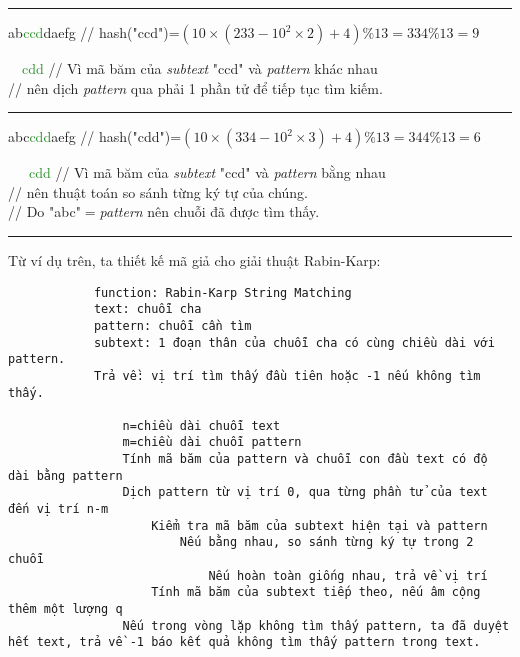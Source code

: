 \documentclass[a4paper,11pt]{article}
\begin{document}
			\vspace*{2mm}
			\hrule
			ab\textcolor{ForestGreen}{ccd}daefg \hspace*{0.6cm} // hash("ccd")=$(10\times(233-10^2\times2)+4)\%13=334\%13=9$
			
			\textcolor{white}{aa}\textcolor{ForestGreen}{cdd} \hspace*{1.4cm} // Vì mã băm của \textit{subtext} "ccd" và \textit{pattern} khác nhau \\
		\hspace*{2.5cm} // nên dịch \textit{pattern} qua phải 1 phần tử để tiếp tục tìm kiếm.

			\vspace*{2mm}
			\hrule
			abc\textcolor{ForestGreen}{cdd}aefg \hspace*{0.6cm} // hash("cdd")=$(10\times(334-10^2\times3)+4)\%13=344\%13=6$
			
			\textcolor{white}{aaa}\textcolor{ForestGreen}{cdd} \hspace*{1.2cm} // Vì mã băm của \textit{subtext} "ccd" và \textit{pattern} bằng nhau \\
		\hspace*{2.5cm} // nên thuật toán so sánh từng ký tự của chúng.\\
		\hspace*{2.5cm} // Do "abc"$=$\textit{pattern} nên chuỗi đã được tìm thấy.

		\vspace*{2mm}
		\hrule
		\vspace*{4mm}
		Từ ví dụ trên, ta thiết kế mã giả cho giải thuật Rabin-Karp:

			\begin{lstlisting}
			function: Rabin-Karp String Matching
			text: chuỗi cha 
			pattern: chuỗi cần tìm 
			subtext: 1 đoạn thân của chuỗi cha có cùng chiều dài với pattern.
			Trả về: vị trí tìm thấy đầu tiên hoặc -1 nếu không tìm thấy.
			
				n=chiều dài chuỗi text
				m=chiều dài chuỗi pattern
				Tính mã băm của pattern và chuỗi con đầu text có độ dài bằng pattern
				Dịch pattern từ vị trí 0, qua từng phần tử của text đến vị trí n-m
					Kiểm tra mã băm của subtext hiện tại và pattern
						Nếu bằng nhau, so sánh từng ký tự trong 2 chuỗi
							Nếu hoàn toàn giống nhau, trả về vị trí
					Tính mã băm của subtext tiếp theo, nếu âm cộng thêm một lượng q
				Nếu trong vòng lặp không tìm thấy pattern, ta đã duyệt hết text, trả về -1 báo kết quả không tìm thấy pattern trong text.
			\end{lstlisting}
\end{document}
